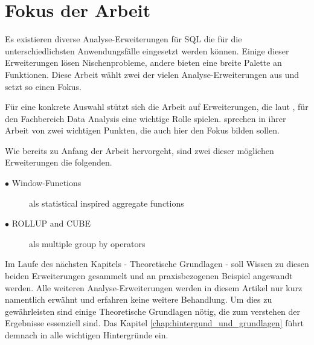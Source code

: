 \section{Fokus der Arbeit}
\label{sec:fokus_der_arbeit} Es existieren diverse Analyse-Erweiterungen für SQL
die für die unterschiedlichsten Anwendungsfälle eingesetzt werden können. Einige
dieser Erweiterungen lösen Nischenprobleme, andere bieten eine breite Palette an
Funktionen. Diese Arbeit wählt zwei der vielen Analyse-Erweiterungen aus und
setzt so einen Fokus.

Für eine konkrete Auswahl stützt sich die Arbeit auf Erweiterungen, die laut \citet[Kapitel3]{FOTACHE2015243},
für den Fachbereich Data Analysis eine wichtige Rolle spielen. \citet[Kapitel 3]{FOTACHE2015243}
sprechen in ihrer Arbeit von zwei wichtigen Punkten, die auch hier den Fokus
bilden sollen.

Wie bereits zu Anfang der Arbeit hervorgeht, sind zwei dieser möglichen Erweiterungen
die folgenden.

\begin{description}
	\item[$\bullet$ Window-Functions] als statistical inspired aggregate functions
		\\ \citep[vgl.][Kapitel 4.3]{FOTACHE2015243}

	\item[$\bullet$ ROLLUP and CUBE] als multiple group by operators \\ \citep[vgl.][Kapitel4.3]{FOTACHE2015243}
\end{description}

Im Laufe des nächsten Kapitels - Theoretische Grundlagen - soll Wissen zu diesen
beiden Erweiterungen gesammelt und an praxisbezogenen Beispiel angewandt werden.
Alle weiteren Analyse-Erweiterungen werden in diesem Artikel nur kurz namentlich
erwähnt und erfahren keine weitere Behandlung. Um dies zu gewährleisten sind
einige Theoretische Grundlagen nötig, die zum verstehen der Ergebnisse essenziell
sind. Das Kapitel \ref{chap:hintergund_und_grundlagen} führt demnach in alle
wichtigen Hintergründe ein.